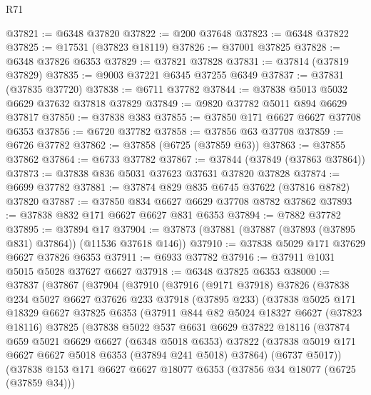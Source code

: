 \begin{lexlean}{R71}
\begin{coremodule}
@37821 := @6348 @37820
@37822 := @200 @37648
@37823 := @6348 @37822
@37825 := @17531 (@37823 @18119)
@37826 := @37001 @37825
@37828 := @6348 @37826 @6353
@37829 := @37821 @37828
@37831 := @37814 (@37819 @37829)
@37835 := @9003 @37221 @6345 @37255 @6349
@37837 := @37831 (@37835 @37720)
@37838 := @6711 @37782
@37844 := @37838 @5013 @5032 @6629 @37632 @37818 @37829
@37849 := @9820 @37782 @5011 @894 @6629 @37817
@37850 := @37838 @383
@37855 := @37850 @171 @6627 @6627 @37708 @6353
@37856 := @6720 @37782
@37858 := @37856 @63 @37708
@37859 := @6726 @37782
@37862 := @37858 (@6725 (@37859 @63))
@37863 := @37855 @37862
@37864 := @6733 @37782
@37867 := @37844 (@37849 (@37863 @37864))
@37873 := @37838 @836 @5031 @37623 @37631 @37820 @37828
@37874 := @6699 @37782
@37881 := @37874 @829 @835 @6745 @37622 (@37816 @8782) @37820
@37887 := @37850 @834 @6627 @6629 @37708 @8782 @37862
@37893 := @37838 @832 @171 @6627 @6627 @831 @6353
@37894 := @7882 @37782
@37895 := @37894 @17
@37904 := @37873 (@37881 (@37887 (@37893 (@37895 @831) @37864)) (@11536 @37618 @146))
@37910 := @37838 @5029 @171 @37629 @6627 @37826 @6353
@37911 := @6933 @37782
@37916 := @37911 @1031 @5015 @5028 @37627 @6627
@37918 := @6348 @37825 @6353
@38000 := @37837
    (@37867
      (@37904
        (@37910
          (@37916
            (@9171 @37918)
            @37826
            (@37838
              @234
              @5027
              @6627
              @37626
              @233
              @37918
              (@37895 @233)
              (@37838
                @5025
                @171
                @18329
                @6627
                @37825
                @6353
                (@37911
                  @844
                  @82
                  @5024
                  @18327
                  @6627
                  (@37823 @18116)
                  @37825
                  (@37838
                    @5022
                    @537
                    @6631
                    @6629
                    @37822
                    @18116
                    (@37874
                      @659
                      @5021
                      @6629
                      @6627
                      (@6348 @5018 @6353)
                      @37822
                      (@37838 @5019 @171 @6627 @6627 @5018 @6353 (@37894 @241 @5018) @37864)
                      (@6737 @5017))
                    (@37838
                      @153
                      @171
                      @6627
                      @6627
                      @18077
                      @6353
                      (@37856 @34 @18077 (@6725 (@37859 @34)))

\end{coremodule}
\end{lexlean}
